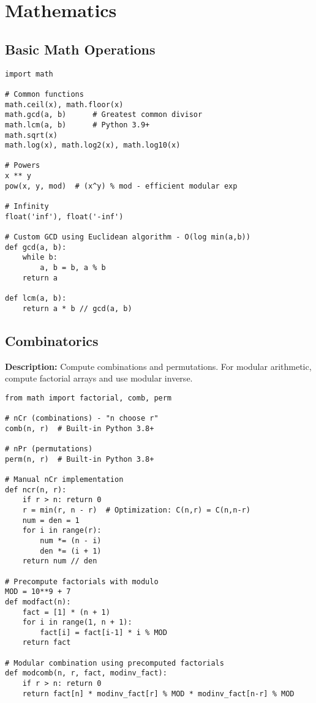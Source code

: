 \section{Mathematics}

\subsection{Basic Math Operations}
\begin{lstlisting}
import math

# Common functions
math.ceil(x), math.floor(x)
math.gcd(a, b)      # Greatest common divisor
math.lcm(a, b)      # Python 3.9+
math.sqrt(x)
math.log(x), math.log2(x), math.log10(x)

# Powers
x ** y
pow(x, y, mod)  # (x^y) % mod - efficient modular exp

# Infinity
float('inf'), float('-inf')

# Custom GCD using Euclidean algorithm - O(log min(a,b))
def gcd(a, b):
    while b:
        a, b = b, a % b
    return a

def lcm(a, b):
    return a * b // gcd(a, b)
\end{lstlisting}

\subsection{Combinatorics}
\textbf{Description:} Compute combinations and permutations. For modular arithmetic, compute factorial arrays and use modular inverse.

\begin{lstlisting}
from math import factorial, comb, perm

# nCr (combinations) - "n choose r"
comb(n, r)  # Built-in Python 3.8+

# nPr (permutations)
perm(n, r)  # Built-in Python 3.8+

# Manual nCr implementation
def ncr(n, r):
    if r > n: return 0
    r = min(r, n - r)  # Optimization: C(n,r) = C(n,n-r)
    num = den = 1
    for i in range(r):
        num *= (n - i)
        den *= (i + 1)
    return num // den

# Precompute factorials with modulo
MOD = 10**9 + 7
def modfact(n):
    fact = [1] * (n + 1)
    for i in range(1, n + 1):
        fact[i] = fact[i-1] * i % MOD
    return fact

# Modular combination using precomputed factorials
def modcomb(n, r, fact, modinv_fact):
    if r > n: return 0
    return fact[n] * modinv_fact[r] % MOD * modinv_fact[n-r] % MOD
\end{lstlisting}
